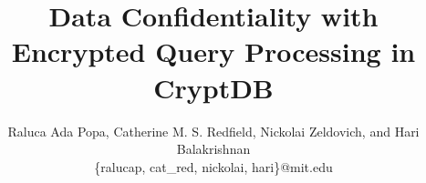 \documentclass[9pt,twocolumn]{article}
\makeatletter
\newcommand{\name}{CryptDB\@\xspace}
\makeatother
\begin{document}
\title{\bf Data Confidentiality with Encrypted Query Processing in CryptDB}
\author{Raluca Ada Popa, Catherine M. S. Redfield, Nickolai Zeldovich, and Hari Balakrishnan \\ \{ralucap, cat\_red, nickolai, hari\}@mit.edu}
\date{}

\newcommand{\RND}{\mathsf{RND}}
\newcommand{\DET}{\mathsf{DET}}
\newcommand{\OPE}{\mathsf{OPE}}
\newcommand{\OPEJOIN}{\mathsf{OPE}\mathrm{-}\mathsf{JOIN}}
\newcommand{\HOM}{\mathsf{HOM}}
\newcommand{\JOIN}{\mathsf{JOIN}}
\newcommand{\SEARCH}{\mathsf{SEARCH}}

\newcommand{\up}{\texttt{UPDATE}}
\newcommand{\ins}{\texttt{INSERT}}
\newcommand{\del}{\texttt{DELETE}}
\newcommand{\sel}{\texttt{SELECT}}

\newcommand{\rap}[1]{\textcolor{blue}{RAP: #1}}
\newcommand{\hb}[1]{\textcolor{red}{HB: #1}}
\newcommand{\nz}[1]{\textcolor{magenta}{NZ: #1}}
\newcommand{\cmsr}[1]{\textcolor{green}{CR: #1}}
\newcommand{\todo}[1]{\textcolor{red}{#1}}


\newcommand{\tput}{27\%}
\newcommand{\MK}{\mathsf{MK}}
\newcommand{\SK}{\mathsf{SK}}
\newcommand{\PK}{\mathsf{PK}}
\newcommand{\fu}{\mathsf{FUNC}}

\newcommand{\pr}{$\mathsf{Principal}$}
\newcommand{\encfor}{$\mathsf{EncFor}$}
\newcommand{\access}{$\mathsf{HasAccessTo}$}
\newcommand{\gives}{$\mathsf{GivesPsswdTo}$}
\newcommand{\und}{$\_$}



\newcommand{\frontend}{frontend} %

\newtheorem{definition}{Definition}
\newtheorem{theorem}{Theorem}

\maketitle







 





{
\scriptsize
\setlength{\bibsep}{3pt}


}
\end{document}
